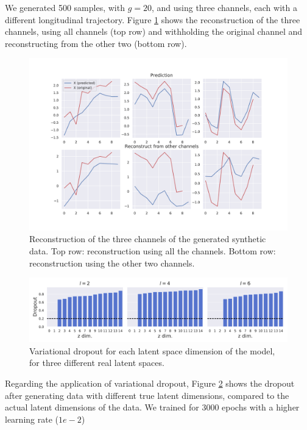 We generated 500 samples, with $g=20$, and using three channels, each with a different longitudinal trajectory. Figure \ref{fig:rnn:synth1} shows the reconstruction of the three channels, using all channels (top row) and withholding the original channel and reconstructing from the other two (bottom row). 

\begin{figure}[!htbp]
  \centering
  \includegraphics[width=1.0\textwidth]{figures/rnnvae/synth_recon.pdf}
  \caption[Synthetic data reconstruction.]{Reconstruction of the three channels of the generated synthetic data. Top row: reconstruction using all the channels. Bottom row: reconstruction using the other two channels.}\label{fig:rnn:synth1}
\end{figure}

\begin{figure}[!htbp]
  \centering
  \includegraphics[width=1.0\textwidth]{figures/rnnvae/synthvardrop.pdf}
  \caption[Variational dropout for synthetic data.]{Variational dropout for each latent space dimension of the model, for three different real latent spaces.}\label{fig:rnn:synthvar}
\end{figure}

Regarding the application of variational dropout, Figure \ref{fig:rnn:synthvar} shows the dropout after generating data with different true latent dimensions, compared to the actual latent dimensions of the data. We trained for 3000 epochs with a higher learning rate ($1e-2$)

